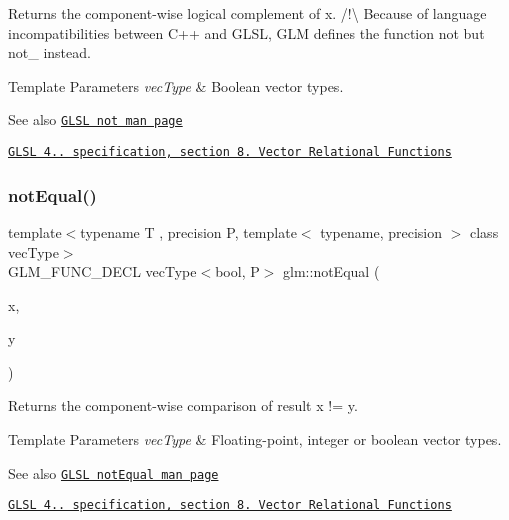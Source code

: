 Returns the component-\/wise logical complement of x. /!\textbackslash{} Because of language incompatibilities between C++ and G\+L\+SL, G\+LM defines the function not but not\+\_\+ instead.


\begin{DoxyTemplParams}{Template Parameters}
{\em vec\+Type} & Boolean vector types.\\
\hline
\end{DoxyTemplParams}
\begin{DoxySeeAlso}{See also}
\href{http://www.opengl.org/sdk/docs/manglsl/xhtml/not.xml}{\tt G\+L\+SL not man page} 

\href{http://www.opengl.org/registry/doc/GLSLangSpec.4.20.8.pdf}{\tt G\+L\+SL 4.. specification, section 8. Vector Relational Functions} 
\end{DoxySeeAlso}
\mbox{\label{group__core__func__vector__relational_ga5aca2b745e5eb0096716bbc394846309}} 
\subsubsection{\texorpdfstring{not\+Equal()}{notEqual()}}
{\footnotesize\ttfamily template$<$typename T , precision P, template$<$ typename, precision $>$ class vec\+Type$>$ \\
G\+L\+M\+\_\+\+F\+U\+N\+C\+\_\+\+D\+E\+CL vec\+Type$<$bool, P$>$ glm\+::not\+Equal (\begin{DoxyParamCaption}\item[{vec\+Type$<$ T, P $>$ const \&}]{x,  }\item[{vec\+Type$<$ T, P $>$ const \&}]{y }\end{DoxyParamCaption})}

Returns the component-\/wise comparison of result x != y.


\begin{DoxyTemplParams}{Template Parameters}
{\em vec\+Type} & Floating-\/point, integer or boolean vector types.\\
\hline
\end{DoxyTemplParams}
\begin{DoxySeeAlso}{See also}
\href{http://www.opengl.org/sdk/docs/manglsl/xhtml/notEqual.xml}{\tt G\+L\+SL not\+Equal man page} 

\href{http://www.opengl.org/registry/doc/GLSLangSpec.4.20.8.pdf}{\tt G\+L\+SL 4.. specification, section 8. Vector Relational Functions} 
\end{DoxySeeAlso}
